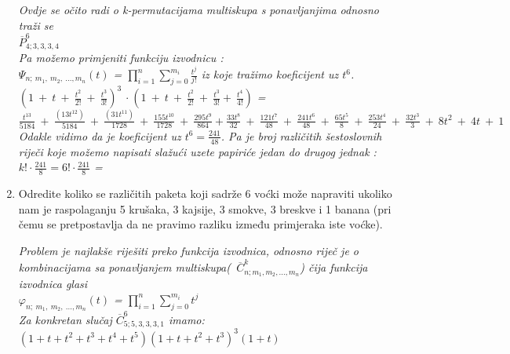 \documentclass[12pt]{article}
\begin{document}
\begin{enumerate}
\begin{center}
		\textit{Ovdje se očito radi o k-permutacijama multiskupa s ponavljanjima odnosno traži se \\$\overline{P}^6_{4; 3, 3, 3, 4}$\\
		Pa možemo primjeniti funkciju izvodnicu :
		\vspace{0.25cm}\\
		$\Psi _{n;\ m_1,\ m_2,\ ...,m_n}(t)$ = $\prod_{i=1}^{n}\sum_{j=0}^{m_i} \frac{t^j}{j!}$ iz koje tražimo koeficijent uz $t^6$. \\
		$(1\ + \ t \ + \ \frac{t^2}{2!}\ + \ \frac{t^3}{3!})^3$ 
		$\cdot \ (1\ + \ t \ + \ \frac{t^2}{2!}\ + \ \frac{t^3}{3!} + \ \frac{t^4}{4!})$ =\vspace{0.25cm} \\
		$\frac{t^{13}}{5184} \ + \ \frac{(13 t^{12})}{5184} \ + \  \frac{(31 t^{11})}{1728} \ + \  \frac{155 t^{10}}{1728} \ + \  \frac{295 t^9}{864} + \frac{33 t^8}{32} \ + \  \frac{121 t^7}{48} \ + \  \frac{241 t^6}{48} \ + \  \frac{65 t^5}{8} \ + \  \frac{253 t^4}{24} \ + \  \frac{32 t^3}{3} \ + \  8t^2 \ + \  4t \ + \  1$\\
		\vspace{0.25cm}
		Odakle vidimo da je koeficijent uz $t^6 = \frac{241}{48}$. Pa je broj različitih šestoslovnih riječi koje možemo napisati slažući uzete papiriće jedan do drugog jednak : \\
		\vspace{0.15cm} $k! \cdot \frac{241}{8} = 6! \cdot \frac{241}{8}$ = 
		}
	    \end{center}
		\item Odredite koliko se različitih paketa koji sadrže 6 voćki može napraviti ukoliko nam je raspolaganju 5 krušaka, 3 kajsije, 3 smokve, 3 breskve i 1 banana (pri čemu se pretpostavlja da ne pravimo razliku između primjeraka iste voćke).
		\begin{center}
		\textit{Problem je najlakše riješiti preko funkcija izvodnica, odnosno riječ je o kombinacijama sa ponavljanjem multiskupa(\ $\overline{C}^k_{n; m_1, m_2, ..., m_n}$) čija funkcija izvodnica glasi\\
		\vspace{0.25cm}
		$\varphi _{n;\ m_1,\ m_2,\ ...,m_n}(t)$ = $\prod_{i=1}^{n}\sum_{j=0}^{m_i} t^j$\\
		\vspace{0.25cm} Za konkretan slučaj $\overline{C}^6_{5;5, 3, 3, 3, 1}$ imamo:\\ \vspace{0.20cm}
		$ (1+t+t^2+t^3+t^4+t^5)(1+t+t^2+t^3)^3(1+t)$
}
\end{center}
\end{enumerate}
\end{document}

